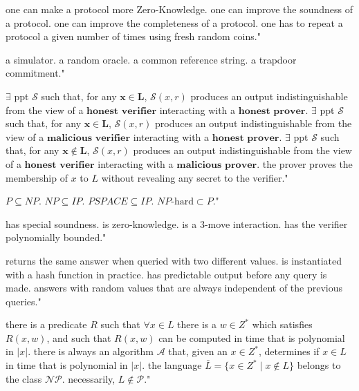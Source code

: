 {one can make a protocol more Zero-Knowledge.}
{one can improve the soundness of a protocol.}
{one can improve the completeness of a protocol.}
{one has to repeat a protocol a given number of times using fresh random coins."}

{a simulator.}
{a random oracle.}
{a common reference string.}
{a trapdoor commitment."}

{$\exists$ ppt $\mathcal{S}$ such that, for any $\mathbf{x \in L}$, $\mathcal{S}(x,r)$ produces an output indistinguishable from the view of a $ \textbf{honest verifier} $ interacting with a $ \textbf{honest prover} $.}
{$\exists$ ppt $\mathcal{S}$ such that, for any $\mathbf{x \in L}$, $\mathcal{S}(x,r)$ produces an output indistinguishable from the view of a $ \textbf{malicious verifier} $ interacting with a $ \textbf{honest prover} $.}
{$\exists$ ppt $\mathcal{S}$ such that, for any $\mathbf{x \not\in L}$, $\mathcal{S}(x,r)$ produces an output indistinguishable from the view of a $ \textbf{honest verifier} $ interacting with a $ \textbf{malicious prover} $.}
{the prover proves the membership of $x$ to $L$ without revealing any secret to the verifier."}

{$P\subseteq NP$.}
{$NP\subseteq IP$.}
{$PSPACE\subseteq IP$.}
{$NP\mbox{-hard} \subset P$."}

{has special soundness.}
{is zero-knowledge.}
{is a 3-move interaction.}
{has the verifier polynomially bounded."}

{returns the same answer when queried with two different values.}
{is instantiated with a hash function in practice.}
{has predictable output before any query is made.}
{answers with random values that are always independent of the previous queries."}

{there is a predicate $R$ such that $\forall x\in L$ there is a $w\in Z^*$ which satisfies $R(x,w)$, and such that $R(x,w)$ can be computed in time that is polynomial in $|x|$.}
{there is always an algorithm $\mathcal{A}$ that, given an $x\in Z^*$, determines if $x\in L$ in time that is polynomial in $|x|$.}
{the language $\bar{L}=\{x \in Z^* \mid x\notin L\}$ belongs to the class $\mathcal{NP}$.}
{necessarily, $L \notin \mathcal{P}$."}

